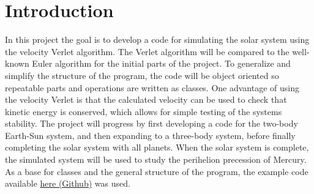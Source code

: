 \section{Introduction}
In this project the goal is to develop a code for simulating the solar system using the velocity
Verlet algorithm. The Verlet algorithm will be compared to the well-known Euler algorithm for the
initial parts of the project. To generalize and simplify the structure of the program, 
the code will be object oriented so repeatable parts and operations are written as classes.
One advantage of using the velocity Verlet is that the calculated velocity can be used to check
that kinetic energy is conserved, which allows for simple testing of the systems stability.
The project will progress by first developing a code for the two-body Earth-Sun system, and then
expanding to a three-body system, before finally completing the solar system with all planets.
When the solar system is complete, the simulated system will be used to study the perihelion
precession of Mercury.
\newline
As a base for classes and the general structure of the program, the example code available
\href{https://github.com/andeplane/solar-system}{here (Github)} was used.
